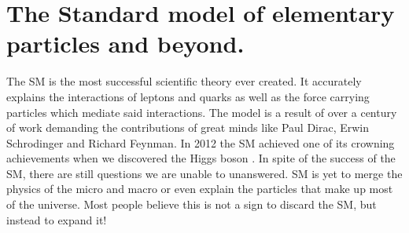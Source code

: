 \chapter{The Standard model of elementary particles and beyond.}

The \ac{SM} is the most successful scientific theory ever
created. It accurately explains the interactions of leptons and quarks as well as the force
carrying particles which mediate said interactions. The model is a result of over a century of work
demanding the contributions of great minds like Paul Dirac, Erwin Schrodinger and Richard Feynman.
In 2012 the SM achieved one of its crowning achievements when we discovered the Higgs boson \cite{Aad_2012}. 
In spite of the success of the \ac{SM}, there are still questions we are unable to unanswered.
\ac{SM} is yet to merge the physics of the micro and macro or even explain the particles that make
up most of the universe. Most people believe this is not a sign to discard the \ac{SM}, but instead to expand it!